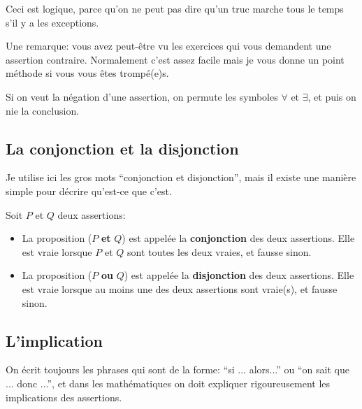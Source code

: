 \documentclass{article}
\begin{document}
Ceci est logique, parce qu'on ne peut pas dire qu'un truc marche tous le temps s'il y a les exceptions.

Une remarque: vous avez peut-être vu les exercices qui vous demandent une assertion contraire. Normalement c'est assez facile mais je vous donne un point méthode si vous vous êtes trompé(e)s.

\begin{tcolorbox}[colback=green!5!white,colframe=green!75!black,title=Point méthode 1.1]

Si on veut la négation d'une assertion, on permute les symboles $\forall$ et $\exists$, et puis on nie la conclusion.

\end{tcolorbox}

\subsection{La conjonction et la disjonction}

Je utilise ici les gros mots ``conjonction et disjonction'', mais il existe une manière simple pour décrire qu'est-ce que c'est.

Soit $P$ et $Q$ deux assertions:

\begin{tcolorbox}[colback=red!5!white,colframe=red!75!black,title=Définition 1.7]

\begin{itemize}
 \item La proposition ($P$ \textbf{et} $Q$) est appelée la \textbf{conjonction} des deux assertions. Elle est vraie lorsque $P$ et $Q$ sont toutes les deux vraies, et fausse sinon.
 \item La proposition ($P$ \textbf{ou} $Q$) est appelée la \textbf{disjonction} des deux assertions. Elle est vraie lorsque au moins une des deux assertions sont vraie(s), et fausse sinon.
\end{itemize}

\end{tcolorbox}

\subsection{L'implication}

On écrit toujours les phrases qui sont de la forme: ``si ... alors...'' ou ``on sait que ... donc ...'', et dans les mathématiques on doit expliquer rigoureusement les implications des assertions.
\end{document}
